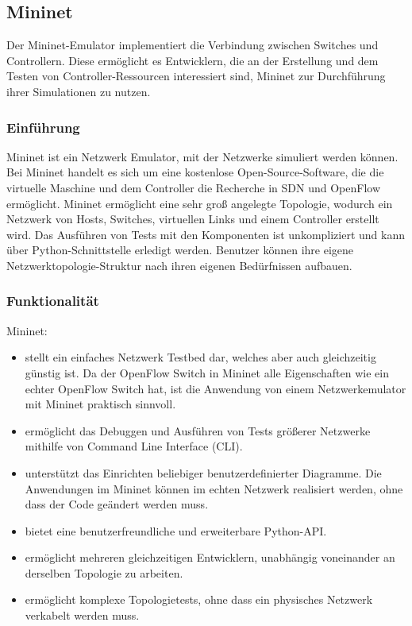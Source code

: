 \documentclass[fontsize=12pt,paper=a4,open=any,parskip=half,
  twoside=false,toc=listof,toc=bibliography,fleqn,leqno,
  captions=nooneline,captions=tableabove,british]{scrbook}
\begin{document}
\subsection{Mininet}
Der Mininet-Emulator implementiert die Verbindung zwischen Switches und Controllern. Diese ermöglicht es Entwicklern, die an der Erstellung und dem Testen von Controller-Ressourcen interessiert sind, Mininet zur Durchführung ihrer Simulationen zu nutzen.

\subsubsection{Einführung}
Mininet ist ein Netzwerk Emulator, mit der Netzwerke simuliert werden können. Bei Mininet handelt es sich um eine kostenlose Open-Source-Software, die die virtuelle Maschine und dem Controller die Recherche in SDN und OpenFlow ermöglicht. Mininet ermöglicht eine sehr groß angelegte Topologie, wodurch ein Netzwerk von Hosts, Switches, virtuellen Links und einem Controller erstellt wird. Das Ausführen von Tests mit den Komponenten ist unkompliziert und kann über Python-Schnittstelle erledigt werden. Benutzer können ihre eigene Netzwerktopologie-Struktur nach ihren eigenen Bedürfnissen aufbauen.

\subsubsection{Funktionalität}
Mininet:
\begin{itemize}
 \item stellt ein einfaches Netzwerk Testbed dar, welches aber auch gleichzeitig günstig ist. Da der OpenFlow Switch in Mininet alle Eigenschaften wie ein echter OpenFlow Switch hat, ist die Anwendung von einem Netzwerkemulator mit Mininet praktisch sinnvoll.
 \item ermöglicht das Debuggen und Ausführen von Tests größerer Netzwerke mithilfe von Command Line Interface (CLI).
 \item unterstützt das Einrichten beliebiger benutzerdefinierter Diagramme. Die Anwendungen im Mininet können im echten Netzwerk realisiert werden, ohne dass der Code geändert werden muss.
 \item bietet eine benutzerfreundliche und erweiterbare Python-API.
 \item ermöglicht mehreren gleichzeitigen Entwicklern, unabhängig voneinander an derselben Topologie zu arbeiten.
 \item ermöglicht komplexe Topologietests, ohne dass ein physisches Netzwerk verkabelt werden muss.
\end{itemize}
\end{document}
